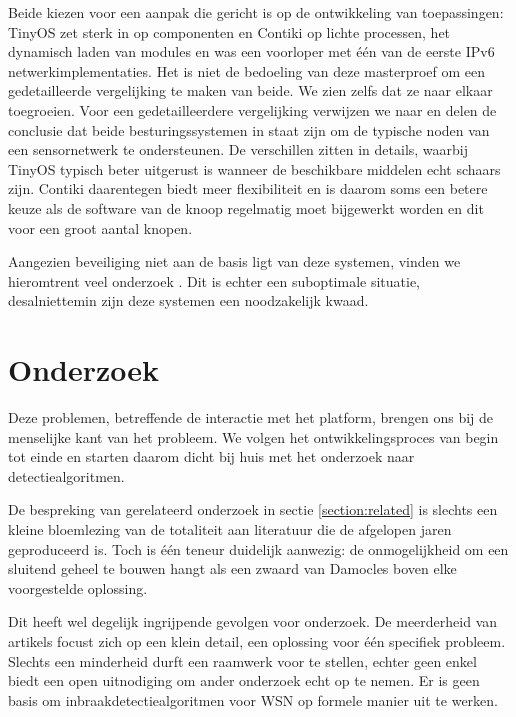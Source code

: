 Beide kiezen voor een aanpak die gericht is op de ontwikkeling van
toepassingen: TinyOS zet sterk in op componenten en Contiki op lichte
processen, het dynamisch laden van modules en was een voorloper met \'e\'en van
de eerste IPv6 netwerkimplementaties. Het is niet de bedoeling van deze
masterproef om een gedetailleerde vergelijking te maken van beide. We zien
zelfs dat ze naar elkaar toegroeien. Voor een gedetailleerdere vergelijking
verwijzen we naar \citep{reusing2012comparison} en delen de conclusie dat beide
besturingssystemen in staat zijn om de typische noden van een sensornetwerk te
ondersteunen. De verschillen zitten in details, waarbij TinyOS typisch beter
uitgerust is wanneer de beschikbare middelen echt schaars zijn. Contiki
daarentegen biedt meer flexibiliteit en is daarom soms een betere keuze als de
software van de knoop regelmatig moet bijgewerkt worden en dit voor een groot
aantal knopen.

Aangezien beveiliging niet aan de basis ligt van deze systemen, vinden we
hieromtrent veel onderzoek \citep{paul2009safe, casado2009contikisec,
karlof2004tinysec}. Dit is echter een suboptimale situatie, desalniettemin zijn
deze systemen een noodzakelijk kwaad.

\section{Onderzoek}
\label{section:problem-research}

Deze problemen, betreffende de interactie met het platform, brengen ons bij de
menselijke kant van het probleem. We volgen het ontwikkelingsproces van begin
tot einde en starten daarom dicht bij huis met het onderzoek naar
detectiealgoritmen.

De bespreking van gerelateerd onderzoek in sectie \ref{section:related} is
slechts een kleine bloemlezing van de totaliteit aan literatuur die de
afgelopen jaren geproduceerd is. Toch is \'e\'en teneur duidelijk aanwezig: de
onmogelijkheid om een sluitend geheel te bouwen hangt als een zwaard van
Damocles boven elke voorgestelde oplossing.

Dit heeft wel degelijk ingrijpende gevolgen voor onderzoek. De meerderheid van
artikels focust zich op een klein detail, een oplossing voor \'e\'en specifiek
probleem. Slechts een minderheid durft een raamwerk voor te stellen, echter
geen enkel biedt een open uitnodiging om ander onderzoek echt op te nemen. Er
is geen basis om inbraakdetectiealgoritmen voor WSN op formele manier uit te
werken.

